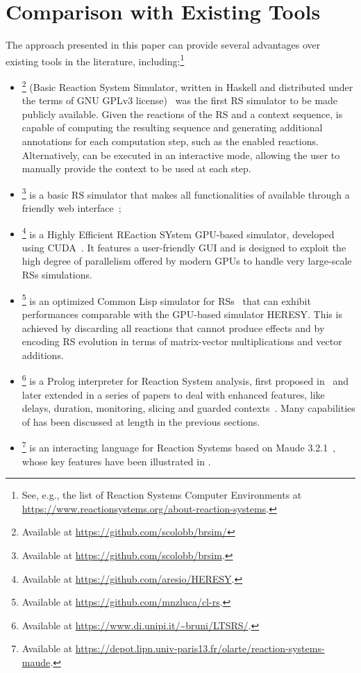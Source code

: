 
\section{Comparison with Existing Tools}\label{sec:related}

The approach presented in this paper can provide several advantages over existing tools in the literature, including:\footnote{See, e.g., the list of Reaction Systems Computer Environments at \url{https://www.reactionsystems.org/about-reaction-systems}.}
\begin{itemize}
\item
\brsim\footnote{Available at \url{https://github.com/scolobb/brsim/}} (Basic Reaction System Simulator, written in Haskell and distributed under the terms of GNU GPLv3 license)~\cite{DBLP:journals/tcs/AzimiGIP15} was the first RS simulator to be made publicly available. 
Given the reactions of the RS and a context sequence, \brsim is capable of computing the resulting sequence and generating additional annotations for each computation step, such as the enabled reactions.
Alternatively, \brsim can be executed in an interactive mode, allowing the user to manually provide the context to be used at each step.
\item
\WebRSim\footnote{Available at \url{https://github.com/scolobb/brsim}.} is a basic RS simulator that makes all functionalities of  \brsim available through a friendly web interface~\cite{DBLP:conf/birthday/0001RAP18};
\item 
\HERESY\footnote{Available at \url{https://github.com/aresio/HERESY}.} is a Highly Efficient REaction SYstem GPU-based simulator, developed using CUDA~\cite{DBLP:journals/tcs/AzimiGIP15}. It features a user-friendly GUI and is designed to exploit the high degree of parallelism offered by modern GPUs to handle very large-scale RSs simulations.
\item
\clrs\footnote{Available at \url{https://github.com/mnzluca/cl-rs}.} is an optimized Common Lisp simulator for RSs~\cite{DBLP:journals/fuin/FerrettiLMP20} that can exhibit performances comparable with the GPU-based simulator \textsf{HERESY}. This is achieved by discarding all reactions that cannot produce effects and by encoding RS evolution in terms of matrix-vector multiplications and vector additions.
\item 
\BioResolve\footnote{Available at \url{https://www.di.unipi.it/~bruni/LTSRS/}.} is a Prolog interpreter for Reaction System analysis, first proposed in~\cite{DBLP:journals/tcs/BrodoBF21} and later extended in a series of papers to deal with enhanced features, like delays, duration, monitoring, slicing and guarded contexts~\cite{DBLP:journals/nca/BrodoBFGLM23,DBLP:journals/nc/BrodoBF24,DBLP:conf/cmsb/BowlesBBFGM24}. Many capabilities of \BioResolve has been discussed at length in the previous sections.
\item
\ccReact\footnote{Available at \url{https://depot.lipn.univ-paris13.fr/olarte/reaction-systems-maude}.} is an interacting language for Reaction Systems based on Maude 3.2.1~\cite{DBLP:conf/cmsb/BallisBFO24}, whose key features have been illustrated in .
\end{itemize}

